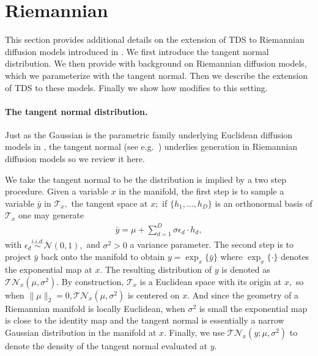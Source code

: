 \section{Riemannian \methodname{}}\label{sec:riemannian}

This section provides additional details on the extension of TDS to Riemannian diffusion models introduced in .
We first introduce the tangent normal distribution.
We then provide with background on Riemannian diffusion models, which we parameterize with the tangent normal.
Then we describe the extension of TDS to these models.
Finally we show how  modifies to this setting.

\paragraph{The tangent normal distribution.}
Just as the Gaussian is the parametric family underlying Euclidean diffusion models in , 
the tangent normal (see e.g.\ \citep{chirikjian2014gaussian,deriemannian})
underlies generation in Riemannian diffusion models so we review it here.

We take the tangent normal to be the distribution is implied by a two step procedure.
Given a variable $x$ in the manifold, the first step is to sample a variable $\bar y$ in $\mathcal{T}_{x},$ the tangent space at $x;$
if $\{h_1, \dots, h_D\}$ is an orthonormal basis of $\mathcal{T}_{x}$
one may generate
\begin{align}
    \bar y = \mu + \sum_{d=1}^D \sigma \epsilon_d \cdot h_d,
\end{align}
with $\epsilon_d\overset{i.i.d.}{\sim}\mathcal{N}(0, 1),$
and $\sigma^2>0$ a variance parameter. 
The second step is to project $\bar y$ back onto the manifold to obtain
$y = \exp_{x}\{ \bar y\}$
where $\exp_{x}\{ \cdot \}$ denotes the exponential map at $x.$ The resulting distribution of $y$ is denoted as $\mathcal{TN}_{x}(\mu, \sigma^2)$. 
By construction, $\mathcal{T}_x$ is a Euclidean space with its origin at $x,$
so when $\|\mu\|_2=0, \mathcal{TN}_{x}(\mu, \sigma^2)$ is centered on $x.$
And since the geometry of a Riemannian manifold is locally Euclidean, when $\sigma^2$ is small
the exponential map is close to the identity map and the tangent normal is essentially a narrow Gaussian distribution in the manifold at $x.$
Finally, we use $\mathcal{TN}_{x}(y;\mu, \sigma^2)$ to denote the density of the tangent normal evaluated at $y$.

